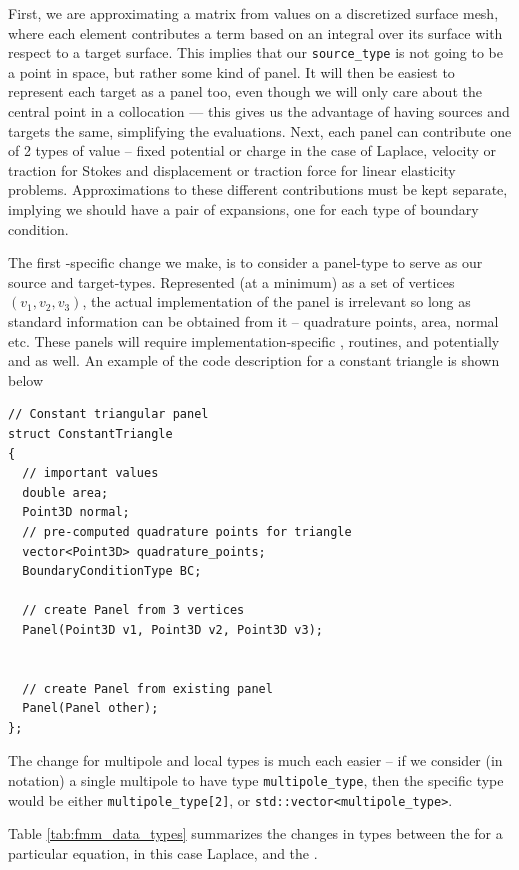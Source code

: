First, we are approximating a matrix from values on a discretized surface mesh, where each element contributes a term based on an integral over its surface with respect to a target surface. This implies that our \lstinline|source_type| is not going to be a point in space, but rather some kind of panel. It will then be easiest to represent each target as a panel too, even though we will only care about the central point in a collocation {\bem} --- this gives us the advantage of having sources and targets the same, simplifying the {\fmm} evaluations. Next, each panel can contribute one of 2 types of value -- fixed potential or charge in the case of Laplace, velocity or traction for Stokes and displacement or traction force for linear elasticity problems. Approximations to these different contributions must be kept separate, implying we should have a pair of expansions, one for each type of boundary condition.


The first {\bem}-specific change we make, is to consider a panel-type to serve as our source and target-types. Represented (at a minimum) as a set of vertices $(v_1,v_2,v_3)$, the actual implementation of the panel is irrelevant so long as standard information can be obtained from it -- quadrature points, area, normal etc. These panels will require implementation-specific {\ptop}, {\ptom} routines, and potentially {\mtop} and {\ltop} as well. An example of the code description for a constant triangle is shown below

\begin{lstlisting}
// Constant triangular panel
struct ConstantTriangle
{
  // important values
  double area;
  Point3D normal;
  // pre-computed quadrature points for triangle
  vector<Point3D> quadrature_points;
  BoundaryConditionType BC;

  // create Panel from 3 vertices
  Panel(Point3D v1, Point3D v2, Point3D v3);
  
  
  // create Panel from existing panel
  Panel(Panel other);
};
\end{lstlisting}

The change for multipole and local types is much each easier -- if we consider (in \cpp notation) a single multipole to have type {\lstinline|multipole_type|}, then the {\bem} specific type would be either {\lstinline|multipole_type[2]|}, or {\lstinline|std::vector<multipole_type>|}.

Table \ref{tab:fmm_data_types} summarizes the changes in types between the {\fmm} for a particular equation, in this case Laplace, and the {\fmmbem}.

